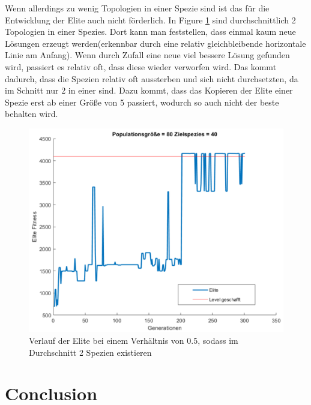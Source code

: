 \documentclass{hbrs-ecta-report}
\begin{document}
Wenn allerdings zu wenig Topologien in einer Spezie sind ist das für die Entwicklung der Elite auch nicht förderlich. In Figure \ref{fig:Verhaeltniss0_5} sind durchschnittlich 2 Topologien in einer Spezies. Dort kann man feststellen, dass einmal kaum neue Lösungen erzeugt werden(erkennbar durch eine relativ gleichbleibende horizontale Linie am Anfang). Wenn durch Zufall eine neue viel bessere Lösung gefunden wird, passiert es relativ oft, dass diese wieder verworfen wird. Das kommt dadurch, dass die Spezien relativ oft aussterben und sich nicht durchsetzten, da im Schnitt nur 2 in einer sind. Dazu kommt, dass das Kopieren der Elite einer Spezie erst ab einer Größe von 5 passiert, wodurch so auch nicht der beste behalten wird.\\
 
\begin{figure}[h!]
\centering
\includegraphics[width=\linewidth]{img/Mario_80_Netze_target_40.png}
\caption{Verlauf der Elite bei einem Verhältnis von 0.5, sodass im Durchschnitt 2 Spezien existieren}
\label{fig:Verhaeltniss0_5} 
\end{figure}



\FloatBarrier
\newpage
\section{Conclusion}



 
\end{document}
